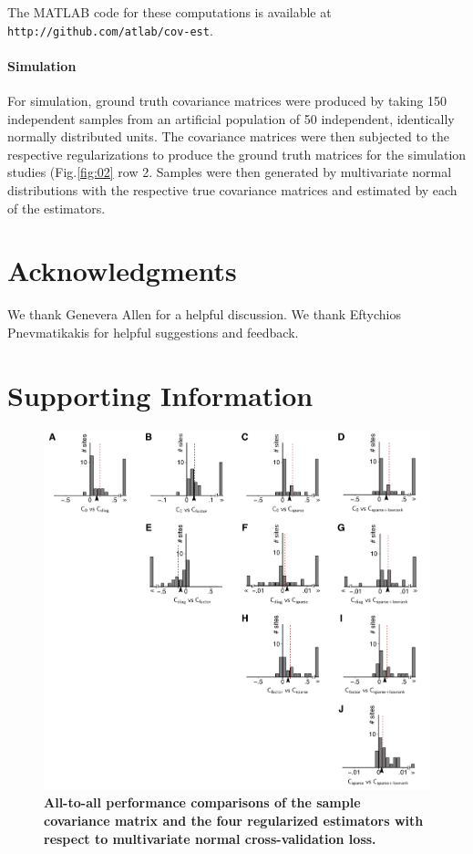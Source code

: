 \documentclass[10pt]{article}
\newcommand{\figref}[2]{Fig.\;\ref{fig:#1}\,#2}
\begin{document}
The MATLAB code for these computations is available at {\tt http://github.com/atlab/cov-est}.


\paragraph{Simulation}
For simulation, ground truth covariance matrices were produced by taking 150 independent samples from an artificial population of 50 independent, identically normally distributed units. The covariance matrices were then subjected to the respective regularizations to produce the ground truth matrices for the simulation studies (\figref{02}{\,row 2}. Samples were then generated by multivariate normal distributions with the respective true covariance matrices and estimated by each of the estimators. 

\section*{Acknowledgments}
We thank Genevera Allen for a helpful discussion.  We thank Eftychios Pnevmatikakis for helpful suggestions and feedback.




\newpage
\section*{Supporting Information}
\setcounter{figure}{0}

\begin{figure}[!ht]
\begin{center}
\includegraphics{./figures/Figure-Supp01.pdf}
\end{center}
\caption{{\bf All-to-all performance comparisons of the sample covariance matrix and the four regularized estimators with respect to multivariate normal cross-validation loss.}
}
\label{supp:01}
\end{figure}
\end{document}
